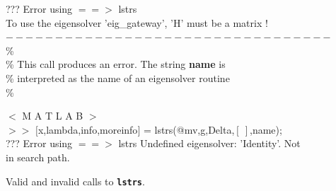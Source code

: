 \documentclass[acmtoms]{acmtrans2m}
\begin{document}
\begin{figure}[h!tbp]
\begin{center}
{{{??? Error using $==>$ lstrs\\
To use the eigensolver 'eig\_gateway', 'H' must be a matrix !\\
$---------------------------------$\\
\%\\
\% This call produces an error. The string {\bf name} is \\
\% interpreted as the name of an eigensolver routine\\
\%

\noindent\hspace{4.5cm} $<$ M A T L A B $>$\\ 

$>>$ $[$x,lambda,info,moreinfo$]$ = lstrs(@mv,g,Delta,$[\ ]$,name);\\

??? Error using $==>$ lstrs
Undefined eigensolver: 'Identity'. Not in search path.

}
}}
\caption{Valid and invalid calls to {\tt\bf lstrs}.}\label{calls2}
\end{center}
\end{figure}
\end{document}

